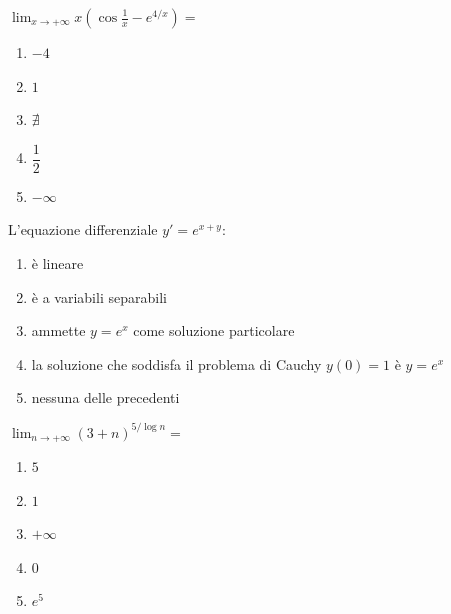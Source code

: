 \begin{quiz}
$\displaystyle\lim_{x\to+\infty}x\left(\cos\frac1x-e^{4/x}\right)=$
\begin{enumerate}
\item $-4$
\item $1$
\item $\nexists$
\item $\dfrac12$
\item $-\infty$
\end{enumerate}
\end{quiz}

\begin{quiz}
L'equazione differenziale $y'=e^{x+y}$:
\begin{enumerate}
\item \`e lineare
\item \`e a variabili separabili
\item ammette $y=e^x$ come soluzione particolare
\item la soluzione che soddisfa il problema di Cauchy $y(0)=1$ \`e $y=e^x$
\item nessuna delle precedenti
\end{enumerate}
\end{quiz}

\begin{quiz}
$\displaystyle\lim_{n\to+\infty}(3+n)^{5/\log n}=$
\begin{enumerate}
\item $5$
\item $1$
\item $+\infty$
\item $0$
\item $e^5$
\end{enumerate}
\end{quiz}

